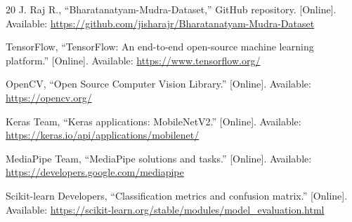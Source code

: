 \documentclass[conference]{IEEEtran}
\begin{document}
\begin{thebibliography}{20}
J. Raj R., ``Bharatanatyam-Mudra-Dataset,'' GitHub repository. [Online]. Available: \url{https://github.com/jisharajr/Bharatanatyam-Mudra-Dataset}

TensorFlow, ``TensorFlow: An end-to-end open-source machine learning platform.'' [Online]. Available: \url{https://www.tensorflow.org/}

OpenCV, ``Open Source Computer Vision Library.'' [Online]. Available: \url{https://opencv.org/}

Keras Team, ``Keras applications: MobileNetV2.'' [Online]. Available: \url{https://keras.io/api/applications/mobilenet/}

MediaPipe Team, ``MediaPipe solutions and tasks.'' [Online]. Available: \url{https://developers.google.com/mediapipe}

Scikit-learn Developers, ``Classification metrics and confusion matrix.'' [Online]. Available: \url{https://scikit-learn.org/stable/modules/model_evaluation.html}
\end{thebibliography}
\end{document}
